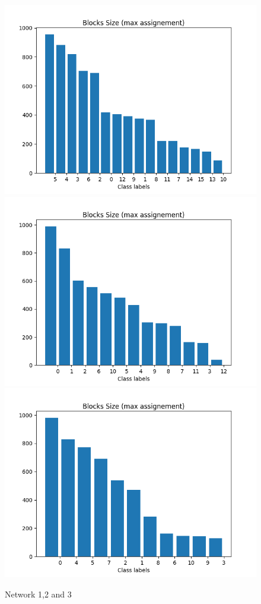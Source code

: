 \documentclass[a4paper, 12pt]{article}
\begin{document}
\begin{figure}[ht]
	\endminipage
		\vspace{-0.28cm}
	\includegraphics[scale=0.27]{img/expe/1_ibp/figure_3}
	\endminipage
	\includegraphics[scale=0.27]{img/expe/2_ibp/figure_3} 
	\endminipage
	\includegraphics[scale=0.27]{img/expe/3_ibp/figure_3}
	\endminipage
    \caption{Network 1,2 and 3}

\end{figure}
\end{document}
